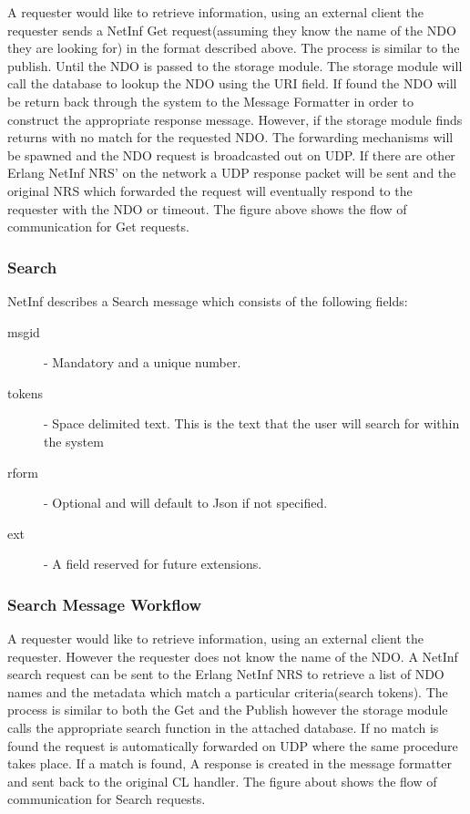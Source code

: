 A requester would like to retrieve information, using an external client the requester sends a NetInf Get request(assuming they know the name of the NDO they are looking for) in the format described above. The process is similar to the publish. Until the NDO is passed to the storage module. The storage module will call the database to lookup the NDO using the URI field. If found the NDO will be return back through the system to the Message Formatter in order to construct the appropriate response message. However, if the storage module finds returns with no match for the requested NDO. The forwarding mechanisms will be spawned and the NDO request is broadcasted out on UDP. If there are other Erlang NetInf NRS' on the network a UDP response packet will be sent and the original NRS which forwarded the request will eventually respond to the requester with the NDO or timeout. The figure above shows the flow of communication for Get requests.

\subsubsection{Search}

NetInf describes a Search message which consists of the following fields:

\begin{description}
\item[msgid] - Mandatory and a unique number.
\item[tokens] - Space delimited text. This is the text that the user will search for within the system
\item[rform] - Optional and will default to Json if not specified.
\item[ext] - A field reserved for future extensions.
\end{description}

\subsubsection{Search Message Workflow}

A requester would like to retrieve information, using an external client the requester. However the requester does not know the name of the NDO. A NetInf search request can be sent to the Erlang NetInf NRS to retrieve a list of NDO names and the metadata which match a particular criteria(search tokens). The process is similar to both the Get and the Publish however the storage module calls the appropriate search function in the attached database. If no match is found the request is automatically forwarded on UDP where the same procedure takes place. If a match is found, A response is created in the message formatter and sent back to the original CL handler. The figure about shows the flow of communication for  Search requests.
